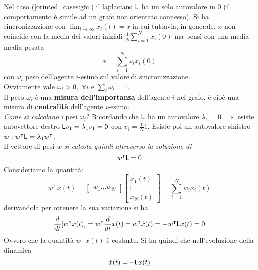 Nel caso (\ref{orinted_cases:gfc}) il laplaciano $\mathsf{L}$ ha un solo autovalore in $0$ (il comportamento \`e simile ad un grafo non orientato connesso). Si ha sincronizzazione con $\lim_{t \to \infty} x_i(t) = \bar{x}$ in cui tuttavia, in generale, $\bar{x}$ non coincide con la media dei valori iniziali $\frac{1}{N} \sum_{i=1}^{N} x_i(0)$ ma bensì con una media media pesata
\begin{equation}
    \bar{x} = \sum_{i=1}^{N} \omega_i x_i(0)
\end{equation}
con $\omega_i$ peso dell'agente $i$-esimo sul valore di sincronizzazione. \\
Ovviamente vale $\omega_i > 0, \hspace{4pt} \forall i$ e $\sum_i \omega_i = 1$.\\
Il peso $\omega_i$ è una \textbf{misura dell'importanza} dell'agente $i$ nel grafo, \`e cio\`e una misura di \textbf{centralità} dell'agente $i$-esimo.\\
\textit{Come si calcolano} i pesi $\omega_i$? Ricordando che $\mathsf{L}$ ha un autovalore $\lambda_1=0 \implies$ esiste autovettore destro $\mathsf{L} v_1 = \lambda_1 v_1 = 0$ con  $v_1 = \frac{1}{N} \underline{1}$. Esiste poi un autovalore sinistro $w: w^\intercal \mathsf{L} = \lambda_1 w^\intercal$. \\
Il vettore di pesi $w$ \textit{si calcola quindi attraverso la soluzione di}
\begin{equation}
    w^\intercal \mathsf{L} = 0
\end{equation}
Consideriamo la quantità:
\begin{equation}
w^\intercal x(t) = 
\begin{bmatrix}
w_1 \dots w_N
\end{bmatrix} \begin{bmatrix}
x_1(t) \\
\vdots \\
x_N(t)
\end{bmatrix} = \sum_{i = 1}^{N} w_i x_i(t)
\end{equation}
derivandola per ottenere la sua variazione si ha
\begin{equation}
    \frac{d}{dt} [w^\intercal x(t)] = w^\intercal \frac{d}{dt} x(t) = w^\intercal \dot x(t) = -w^\intercal \mathsf{L} x(t) = 0
\end{equation}
Ovvero che la quantit\`a $w^\intercal x(t)$ è costante. Si ha quindi che nell'evoluzione della dinamica
\begin{equation}
    \dot{x}(t) = - \mathsf{L} x(t)
\end{equation}
